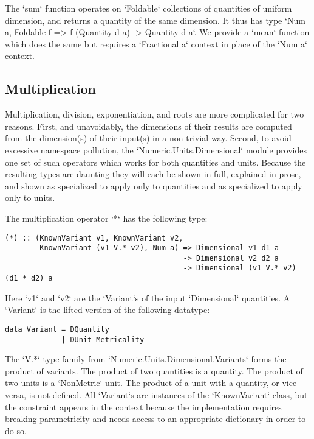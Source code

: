 \documentclass[11pt]{report}
\begin{document}
The `sum` function operates on `Foldable` collections of quantities of uniform dimension, and returns a quantity of
the same dimension. It thus has type `Num a, Foldable f => f (Quantity d a) -> Quantity d a`. We provide a `mean` function
which does the same but requires a `Fractional a` context in place of the `Num a` context.

\subsection{Multiplication}

Multiplication, division, exponentiation, and roots are more complicated for two reasons. First, and unavoidably, the dimensions of their results are computed
from the dimension(s) of their input(s) in a non-trivial way. Second, to avoid excessive namespace pollution, the `Numeric.Units.Dimensional` module provides
one set of such operators which works for both quantities and units. Because the resulting types are daunting they will each be shown in full, explained in prose,
and shown as specialized to apply only to quantities and as specialized to apply only to units.

The multiplication operator `*` has the following type:

\begin{lstlisting}
(*) :: (KnownVariant v1, KnownVariant v2,
        KnownVariant (v1 V.* v2), Num a) => Dimensional v1 d1 a
                                         -> Dimensional v2 d2 a
                                         -> Dimensional (v1 V.* v2) (d1 * d2) a
\end{lstlisting}

Here `v1` and `v2` are the `Variant`s of the input `Dimensional` quantities. A `Variant` is the lifted version of the
following datatype:

\begin{lstlisting}
data Variant = DQuantity
             | DUnit Metricality
\end{lstlisting}

The `V.*` type family from `Numeric.Units.Dimensional.Variants` forms the product of variants. The product of two quantities is a quantity.
The product of two units is a `NonMetric` unit. The product of a unit with a quantity, or vice versa, is not defined. All `Variant`s are
instances of the `KnownVariant` class, but the constraint appears in the context because the implementation requires breaking parametricity and
needs access to an appropriate dictionary in order to do so.
\end{document}
